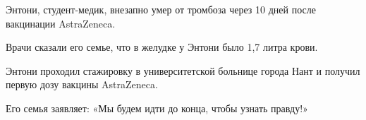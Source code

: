 Энтони, студент-медик, внезапно умер от тромбоза через 10 дней после вакцинации
AstraZeneca.

Врачи сказали его семье, что в желудке у Энтони было 1,7 литра крови.

Энтони проходил стажировку в университетской больнице города Нант и получил
первую дозу вакцины AstraZeneca.

Его семья заявляет: «Мы будем идти до конца, чтобы узнать правду!»

